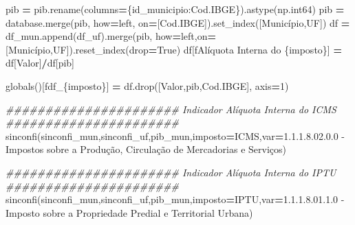 \documentclass[
  12,
  dvipsnames]{article}
\newenvironment{Shaded}{\begin{snugshade}}{\end{snugshade}}
\newcommand{\BuiltInTok}[1]{#1}
\newcommand{\CommentTok}[1]{\textcolor[rgb]{0.56,0.35,0.01}{\textit{#1}}}
\newcommand{\DecValTok}[1]{\textcolor[rgb]{0.00,0.00,0.81}{#1}}
\newcommand{\NormalTok}[1]{#1}
\newcommand{\OperatorTok}[1]{\textcolor[rgb]{0.81,0.36,0.00}{\textbf{#1}}}
\newcommand{\SpecialCharTok}[1]{\textcolor[rgb]{0.00,0.00,0.00}{#1}}
\newcommand{\SpecialStringTok}[1]{\textcolor[rgb]{0.31,0.60,0.02}{#1}}
\newcommand{\StringTok}[1]{\textcolor[rgb]{0.31,0.60,0.02}{#1}}
\newcommand{\VariableTok}[1]{\textcolor[rgb]{0.00,0.00,0.00}{#1}}
\begin{document}
\begin{Shaded}
\begin{Highlighting}[]
\NormalTok{    pib }\OperatorTok{=}\NormalTok{ pib.rename(columns}\OperatorTok{=}\NormalTok{\{}\StringTok{\textquotesingle{}id\_municipio\textquotesingle{}}\NormalTok{:}\StringTok{\textquotesingle{}Cod.IBGE\textquotesingle{}}\NormalTok{\}).astype(np.int64)}
\NormalTok{    pib }\OperatorTok{=}\NormalTok{ database.merge(pib, how}\OperatorTok{=}\StringTok{\textquotesingle{}left\textquotesingle{}}\NormalTok{, on}\OperatorTok{=}\NormalTok{[}\StringTok{\textquotesingle{}Cod.IBGE\textquotesingle{}}\NormalTok{]).set\_index([}\StringTok{\textquotesingle{}Município\textquotesingle{}}\NormalTok{,}\StringTok{\textquotesingle{}UF\textquotesingle{}}\NormalTok{])}
\NormalTok{    df }\OperatorTok{=}\NormalTok{ df\_mun.append(df\_uf).merge(pib, how}\OperatorTok{=}\StringTok{\textquotesingle{}left\textquotesingle{}}\NormalTok{,on}\OperatorTok{=}\NormalTok{[}\StringTok{\textquotesingle{}Município\textquotesingle{}}\NormalTok{,}\StringTok{\textquotesingle{}UF\textquotesingle{}}\NormalTok{]).reset\_index(drop}\OperatorTok{=}\VariableTok{True}\NormalTok{)}
\NormalTok{    df[}\SpecialStringTok{f\textquotesingle{}Alíquota Interna do }\SpecialCharTok{\{}\NormalTok{imposto}\SpecialCharTok{\}}\SpecialStringTok{\textquotesingle{}}\NormalTok{] }\OperatorTok{=}\NormalTok{ df[}\StringTok{\textquotesingle{}Valor\textquotesingle{}}\NormalTok{]}\OperatorTok{/}\NormalTok{df[}\StringTok{\textquotesingle{}pib\textquotesingle{}}\NormalTok{]}
    
    \BuiltInTok{globals}\NormalTok{()[}\SpecialStringTok{f\textquotesingle{}df\_}\SpecialCharTok{\{}\NormalTok{imposto}\SpecialCharTok{\}}\SpecialStringTok{\textquotesingle{}}\NormalTok{] }\OperatorTok{=}\NormalTok{ df.drop([}\StringTok{\textquotesingle{}Valor\textquotesingle{}}\NormalTok{,}\StringTok{\textquotesingle{}pib\textquotesingle{}}\NormalTok{,}\StringTok{\textquotesingle{}Cod.IBGE\textquotesingle{}}\NormalTok{], axis}\OperatorTok{=}\DecValTok{1}\NormalTok{)}
    
\CommentTok{\#\#\#\#\#\#\#\#\#\#\#\#\#\#\#\#\#\#\#\#\#\# Indicador Alíquota Interna do ICMS \#\#\#\#\#\#\#\#\#\#\#\#\#\#\#\#\#\#\#\#\#\#}
\NormalTok{sinconfi(sinconfi\_mun,sinconfi\_uf,pib\_mun,imposto}\OperatorTok{=}\StringTok{\textquotesingle{}ICMS\textquotesingle{}}\NormalTok{,var}\OperatorTok{=}\StringTok{\textquotesingle{}1.1.1.8.02.0.0 {-} Impostos sobre a Produção, Circulação de Mercadorias e Serviços\textquotesingle{}}\NormalTok{)}

\CommentTok{\#\#\#\#\#\#\#\#\#\#\#\#\#\#\#\#\#\#\#\#\#\# Indicador Alíquota Interna do IPTU \#\#\#\#\#\#\#\#\#\#\#\#\#\#\#\#\#\#\#\#\#\#}
\NormalTok{sinconfi(sinconfi\_mun,sinconfi\_uf,pib\_mun,imposto}\OperatorTok{=}\StringTok{\textquotesingle{}IPTU\textquotesingle{}}\NormalTok{,var}\OperatorTok{=}\StringTok{\textquotesingle{}1.1.1.8.01.1.0 {-} Imposto sobre a Propriedade Predial e Territorial Urbana\textquotesingle{}}\NormalTok{)}


\end{Highlighting}
\end{Shaded}
\end{document}
